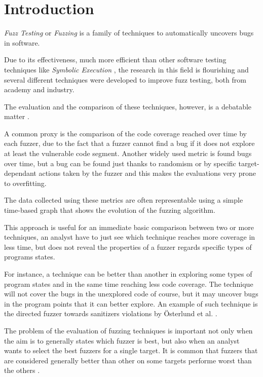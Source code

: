 \documentclass[conference,compsoc]{IEEEtran}
\begin{document}
\section{Introduction}

{\em Fuzz Testing} or {\em Fuzzing} is a family of techniques to automatically uncovers bugs in software.

Due to its effectiveness, much more efficient than other software testing techniques like {\it Symbolic Execution} \cite{redqueen} \cite{sebastian}, the research in this field is flourishing and several different techniques were developed to improve fuzz testing, both from academy and industry.

The evaluation and the comparison of these techniques, however, is a debatable matter \cite{fuzzeval}.

A common proxy is the comparison of the code coverage reached over time by each fuzzer, due to the fact that a fuzzer cannot find a bug if it does not explore at least the vulnerable code segment.
Another widely used metric is found bugs over time, but a bug can be found just thanks to randomism or by specific target-dependant actions taken by the fuzzer and this makes the evaluations very prone to overfitting.

The data collected using these metrics are often representable using a simple time-based graph that shows the evolution of the fuzzing algorithm.

This approach is useful for an immediate basic comparison between two or more techniques, an analyst have to just see which technique reaches more coverage in less time, but does not reveal the properties of a fuzzer regards specific types of programs states.

For instance, a technique can be better than another in exploring some types of program states and in the same time reaching less code coverage.
The technique will not cover the bugs in the unexplored code of course, but it may uncover bugs in the program points that it can better explore.
An example of such technique is the directed fuzzer towards sanitizers violations by \"Osterlund et al. \cite{parmesan}.

The problem of the evaluation of fuzzing techniques is important not only when the aim is to generally states which fuzzer is best, but also when an analyst wants to select the best fuzzers for a single target. It is common that fuzzers that are considered generally better than other on some targets performe worst than the others \cite{aflplusplus}.
\end{document}
